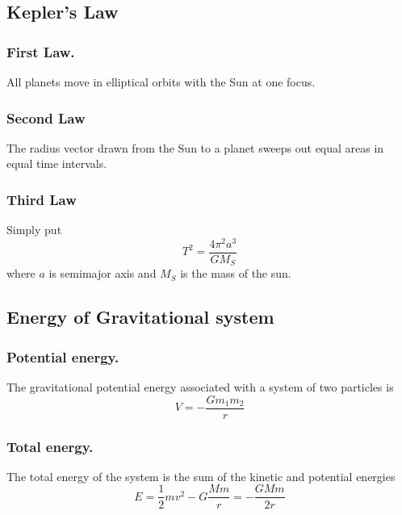 \documentclass[../../../main.tex]{subfiles}
\begin{document}
\subsection*{Kepler's Law}
\subsubsection*{First Law.} All planets move in elliptical orbits with the Sun at one focus.
\subsubsection*{Second Law} The radius vector drawn from the Sun to a planet sweeps out equal areas in equal time intervals.
\subsubsection*{Third Law} Simply put 
\begin{equation*}
    T^2=\frac{4\pi^2a^3}{GM_S}
\end{equation*}
where $a$ is semimajor axis and $M_S$ is the mass of the sun. 

\subsection*{Energy of Gravitational system}
\subsubsection*{Potential energy.} The gravitational potential energy associated with a system of two particles is
\begin{equation*}
    V=-\frac{Gm_1m_2}{r}
\end{equation*}
\subsubsection*{Total energy.} The total energy of the system is the sum
of the kinetic and potential energies
\begin{equation*}
    E=\frac{1}{2}mv^2-G\frac{Mm}{r}=-\frac{GMm}{2r}
\end{equation*}
\end{document}
